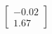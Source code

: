 \documentclass[preview]{standalone}
\begin{document}
\begin{align*}
\begin{bmatrix} -0.02 \\ 1.67 \end{bmatrix}
\end{align*}
\end{document}
